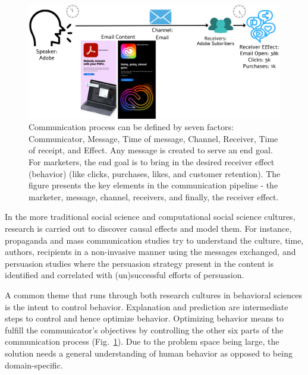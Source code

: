 \documentclass[hidelinks,11pt,a4paper]{report}
\renewcommand{\cite}[1]{\citep{#1}}
\begin{document}
\begin{figure}[!th]
  \centering
  \includegraphics[width=1.0\textwidth]{images/factors of communication.pdf}
  \caption{Communication process can be defined by seven factors: Communicator, Message, Time of message, Channel, Receiver, Time of receipt, and Effect. Any message is created to serve an end goal. For marketers, the end goal is to bring in the desired receiver effect (behavior) (like clicks, purchases, likes, and customer retention). The figure presents the key elements in the communication pipeline - the marketer, message, channel, receivers, and finally, the receiver effect.   \label{fig:factors-of-communication}}
\end{figure}


In the more traditional social science and computational social science cultures, research is carried out to discover causal effects and model them. 
For instance, propaganda and mass communication studies \cite{mcquail1987mass,krippendorff2018content,lasswell1948structure,lasswell1971propaganda} try to understand the culture, time, authors, recipients in a non-invasive manner using the messages exchanged, and persuasion studies \cite{petty1981effects,chaiken1980heuristic} where the persuasion strategy present in the content is identified and correlated with (un)successful efforts of persuasion. 




A common theme that runs through both research cultures in behavioral sciences is the intent to control behavior. Explanation and prediction are intermediate steps to control and hence optimize behavior. Optimizing behavior means to fulfill the communicator's objectives by controlling the other six parts of the communication process (Fig.~\ref{fig:factors-of-communication}). Due to the problem space being large, the solution needs a general understanding of human behavior as opposed to being domain-specific. 
\end{document}
